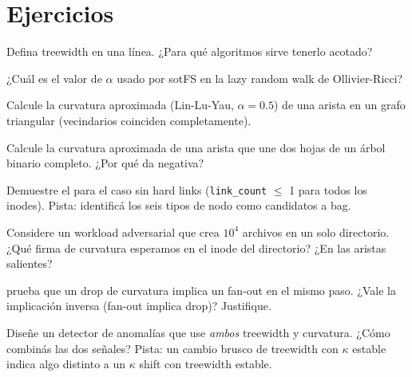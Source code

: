 \section*{Ejercicios}

\begin{ejercicio}[\dificultad{$\star$}]
\label{ej:topo-1}
Defina treewidth en una línea. ¿Para qué algoritmos sirve tenerlo
acotado?
\end{ejercicio}

\begin{ejercicio}[\dificultad{$\star$}]
\label{ej:topo-2}
¿Cuál es el valor de $\alpha$ usado por sotFS en la lazy random walk
de Ollivier-Ricci?
\end{ejercicio}

\begin{ejercicio}[\dificultad{$\star\star$}]
\label{ej:topo-3}
Calcule la curvatura aproximada (Lin-Lu-Yau, $\alpha = 0.5$) de una
arista en un grafo triangular (vecindarios coinciden completamente).
\end{ejercicio}

\begin{ejercicio}[\dificultad{$\star\star$}]
\label{ej:topo-4}
Calcule la curvatura aproximada de una arista que une dos hojas de un
árbol binario completo. ¿Por qué da negativa?
\end{ejercicio}

\begin{ejercicio}[\dificultad{$\star\star$}]
\label{ej:topo-5}
Demuestre el  para el caso sin hard links
(\texttt{link\_count} $\leq$ 1 para todos los inodes). Pista: identificá
los seis tipos de nodo como candidatos a bag.
\end{ejercicio}

\begin{ejercicio}[\dificultad{$\star\star$}]
\label{ej:topo-6}
Considere un workload adversarial que crea $10^4$ archivos en un solo
directorio. ¿Qué firma de curvatura esperamos en el inode del
directorio? ¿En las aristas \econtains{} salientes?
\end{ejercicio}

\begin{ejercicio}[\dificultad{$\star\star\star$}]
\label{ej:topo-7}
 prueba que un drop de curvatura
implica un fan-out en el mismo paso. ¿Vale la implicación inversa
(fan-out implica drop)? Justifique.
\end{ejercicio}

\begin{ejercicio}[\dificultad{$\star\star\star$}]
\label{ej:topo-8}
Diseñe un detector de anomalías que use \emph{ambos} treewidth y
curvatura. ¿Cómo combinás las dos señales? Pista: un cambio brusco de
treewidth con $\kappa$ estable indica algo distinto a un $\kappa$
shift con treewidth estable.
\end{ejercicio}
